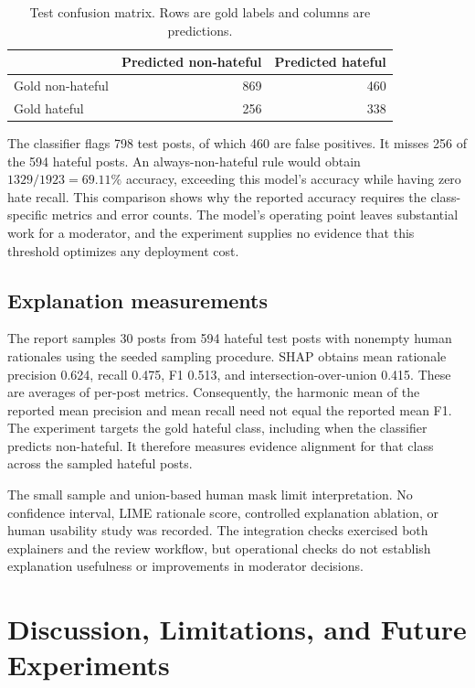 \documentclass[11pt,a4paper]{article}
\begin{document}
\begin{table}[ht]
\centering
\caption{Test confusion matrix. Rows are gold labels and columns are predictions.}
\label{tab:confusion}
\begin{tabular}{lrr}
\toprule
 & Predicted non-hateful & Predicted hateful\\
\midrule
Gold non-hateful & 869 & 460\\
Gold hateful & 256 & 338\\
\bottomrule
\end{tabular}
\end{table}

The classifier flags 798 test posts, of which 460 are false positives.
It misses 256 of the 594 hateful posts. An always-non-hateful rule would obtain
$1329/1923=69.11\%$ accuracy, exceeding this model's accuracy while having zero
hate recall. This comparison shows why the reported accuracy requires the
class-specific metrics and error counts. The model's operating point leaves
substantial work for a moderator, and the experiment supplies no evidence that
this threshold optimizes any deployment cost.

\subsection{Explanation measurements}
The report samples 30 posts from 594 hateful test posts with nonempty human
rationales using the seeded sampling procedure. SHAP obtains mean rationale
precision 0.624, recall 0.475, F1 0.513, and intersection-over-union 0.415.
These are averages of per-post metrics. Consequently, the harmonic mean of the
reported mean precision and mean recall need not equal the reported mean F1.
The experiment targets the gold hateful class, including when the classifier
predicts non-hateful. It therefore measures evidence alignment for that class
across the sampled hateful posts.

The small sample and union-based human mask limit interpretation. No confidence
interval, LIME rationale score, controlled explanation ablation, or human
usability study was recorded. The integration checks exercised both explainers
and the review workflow, but operational checks do not establish explanation
usefulness or improvements in moderator decisions.

\clearpage
\section{Discussion, Limitations, and Future Experiments}
\end{document}
